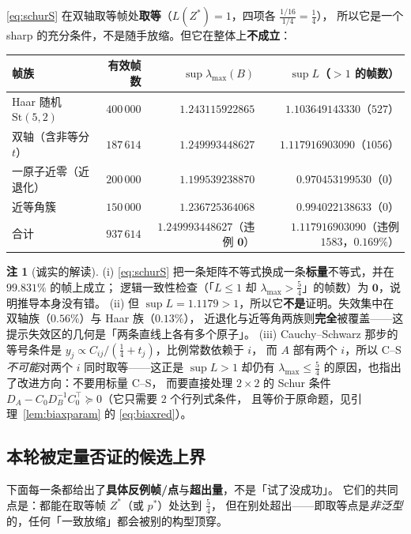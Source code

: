 \documentclass[UTF8,11pt]{ctexart}
\theoremstyle{definition}
\newtheorem{remark}[theorem]{注}
\begin{document}
\eqref{eq:schurS} 在双轴取等帧处\textbf{取等}（$L(Z^\ast)=1$，四项各 $\frac{1/16}{1/4}=\frac14$），
所以它是一个 sharp 的充分条件，不是随手放缩。但它在整体上\textbf{不成立}：

\begin{center}
\begin{tabular}{l r r r}
\toprule
帧族 & 有效帧数 & $\sup\lambda_{\max}(B)$ & $\sup L$（$>1$ 的帧数）\\
\midrule
Haar 随机 $\mathrm{St}(5,2)$ & $400\,000$ & $1.243115922865$ & $1.103649143330$（$527$）\\
双轴（含非等分 $t$） & $187\,614$ & $1.249993448627$ & $1.117916903090$（$1056$）\\
一原子近零（近退化） & $200\,000$ & $1.199539238870$ & $0.970453199530$（$0$）\\
近等角簇 & $150\,000$ & $1.236725364068$ & $0.994022138633$（$0$）\\
\midrule
合计 & $937\,614$ & $\mathbf{1.249993448627}$（违例 $\mathbf0$） & $1.117916903090$（违例 $1583$，$0.169\%$）\\
\bottomrule
\end{tabular}
\end{center}

\begin{remark}[诚实的解读]\label{rmk:schur}
(i) \eqref{eq:schurS} 把一条矩阵不等式换成一条\textbf{标量}不等式，并在 $99.831\%$ 的帧上成立；
逻辑一致性检查（「$L\le1$ 却 $\lambda_{\max}>\frac54$」的帧数）为 $\mathbf0$，说明推导本身没有错。
(ii) 但 $\sup L=1.1179>\!1$，所以它\textbf{不是}证明。失效集中在双轴族（$0.56\%$）与 Haar 族（$0.13\%$），
近退化与近等角两族则\textbf{完全}被覆盖——这提示失效区的几何是「两条直线上各有多个原子」。
(iii) Cauchy--Schwarz 那步的等号条件是 $y_j\propto C_{ij}/(\frac14+t_j)$，比例常数依赖于 $i$，
而 $A$ 部有两个 $i$，所以 C--S \emph{不可能}对两个 $i$ 同时取等——这正是 $\sup L>1$ 却仍有
$\lambda_{\max}\le\frac54$ 的原因，也指出了改进方向：不要用标量 C--S，
而要直接处理 $2\times2$ 的 Schur 条件 $D_A-C_0D_B^{-1}C_0^\top\succeq0$（它只需要 $2$ 个行列式条件，
且等价于原命题，见引理~\ref{lem:biaxparam} 的 \eqref{eq:biaxred}）。
\end{remark}

\subsection{本轮被定量否证的候选上界}\label{sec:refuted5}

下面每一条都给出了\textbf{具体反例帧/点}与\textbf{超出量}，不是「试了没成功」。
它们的共同点是：都能在取等帧 $Z^\ast$（或 $p^\ast$）处达到 $\frac54$，
但在别处超出——即取等点是\emph{非泛型}的，任何「一致放缩」都会被别的构型顶穿。
\end{document}
